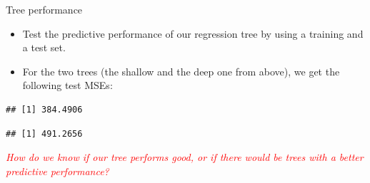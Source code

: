 \documentclass[10pt,ignorenonframetext,]{beamer}
\newenvironment{Shaded}{\begin{snugshade}}{\end{snugshade}}
\newcommand{\KeywordTok}[1]{\textcolor[rgb]{0.13,0.29,0.53}{\textbf{#1}}}
\newcommand{\DataTypeTok}[1]{\textcolor[rgb]{0.13,0.29,0.53}{#1}}
\newcommand{\DecValTok}[1]{\textcolor[rgb]{0.00,0.00,0.81}{#1}}
\newcommand{\StringTok}[1]{\textcolor[rgb]{0.31,0.60,0.02}{#1}}
\newcommand{\OperatorTok}[1]{\textcolor[rgb]{0.81,0.36,0.00}{\textbf{#1}}}
\newcommand{\NormalTok}[1]{#1}
\providecommand{\tightlist}{%
  \setlength{\itemsep}{0pt}\setlength{\parskip}{0pt}}
\begin{document}
\begin{frame}[fragile]

\begin{block}{Tree performance}

\vspace{2mm}

\begin{itemize}
\tightlist
\item
  Test the predictive performance of our regression tree by using a
  training and a test set.
\item
  For the two trees (the shallow and the deep one from above), we get
  the following test MSEs:
\end{itemize}

\scriptsize

\begin{Shaded}
\end{Shaded}

\begin{verbatim}
## [1] 384.4906
\end{verbatim}

\begin{Shaded}
\end{Shaded}

\begin{verbatim}
## [1] 491.2656
\end{verbatim}

\vspace{1mm}

\normalsize
\emph{\textcolor{red}{How do we know if our tree performs good, or if there would be trees with a better predictive performance?}}

\end{block}

\end{frame}
\end{document}
